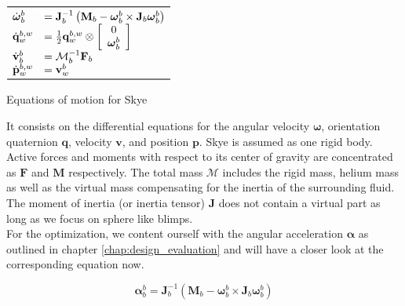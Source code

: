 \begin{table}[htb!]
\centering
\label{tab:sys_mod}
$\begin{array}{ll}
\toprule
\dot{\boldsymbol{\omega}}_b^b &= \mathbf{J}_b^{-1} \left( \mathbf{M}_b  - \boldsymbol{\omega}_b^b \times \mathbf{J}_b \boldsymbol{\omega}_b^b \right) \\

\dot{\mathbf{q}}_w^{b,w} &= \frac{1}{2} \mathbf{q}_w^{b,w} \otimes \left[
\begin{array}{c}
	0 \\ \boldsymbol{\omega}_b^b
\end{array} \right] \\

\dot{\mathbf{v}}_b^b &= \mathbf{\mathcal{M}}_b^{-1} \mathbf{F}_b \\

\dot{\mathbf{p}}_w^{b,w} &= \mathbf{v}_w^b \\

\bottomrule
\end{array}$
\caption{Equations of motion for Skye}
\end{table}

It consists on the differential equations for the angular velocity $\boldsymbol{\omega}$, orientation quaternion $\mathbf{q}$, velocity $\mathbf{v}$, and position $\mathbf{p}$.
Skye is assumed as one rigid body.
Active forces and moments with respect to its center of gravity are concentrated as $\mathbf{F}$ and $\mathbf{M}$ respectively.
The total mass $\mathbf{\mathcal{M}}$ includes the rigid mass, helium mass as well as the virtual mass compensating for the inertia of the surrounding fluid.
The moment of inertia (or inertia tensor) $\mathbf{J}$ does not contain a virtual part as long as we focus on sphere like blimps.
\\
For the optimization, we content ourself with the angular acceleration $\boldsymbol{\alpha}$ as outlined in chapter \ref{chap:design_evaluation} and will have a closer look at the corresponding equation now.

\begin{equation}
\label{eq:angular_accel}
\boldsymbol{\alpha}_b^b = \mathbf{J}_b^{-1} \left( \mathbf{M}_b  - \boldsymbol{\omega}_b^b \times \mathbf{J}_b \boldsymbol{\omega}_b^b \right)
\end{equation}

